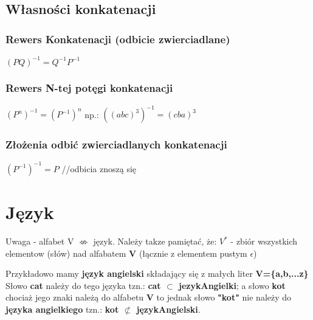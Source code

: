 
\subsection{Własności konkatenacji}
	\subsubsection{Rewers Konkatenacji (odbicie zwierciadlane)}
	$(PQ)^{-1} = Q^{-1}P^{-1}$

	\subsubsection{Rewers N-tej potęgi konkatenacji}
	$(P^{n})^{-1} = (P^{-1})^{n}$  np.: $((abc)^{3})^{-1} = (cba)^{3}$
	
	\subsubsection{Złożenia odbić zwierciadlanych konkatenacji}
	$(P^{-1})^{-1} = P$ //odbicia znoszą się




\section{Język}
{\color{red} Uwaga - alfabet V $\not\Leftrightarrow$ język.} \newline
Należy takze pamiętać, że:
 $V^{*}$ - zbiór wszystkich elementow (słów) nad alfabatem { \bf V} (łącznie z elementem pustym $\epsilon$)\newline \newline


\newline

Przykładowo mamy \textbf{język angielski} składający się z małych liter \textbf{V=\{a,b,...z\}}
Słowo \textbf{cat} należy do tego języka  tzn.: \textbf{ cat $\subset$ jezykAngielki}; \newline 
a słowo \textbf{kot} chociaż jego znaki należą do alfabetu \textbf{V} to jednak słowo \textbf{"kot"} nie należy do \textbf{języka angielkiego} tzn.: \textbf{kot $\not\subset$ językAngielski}.

